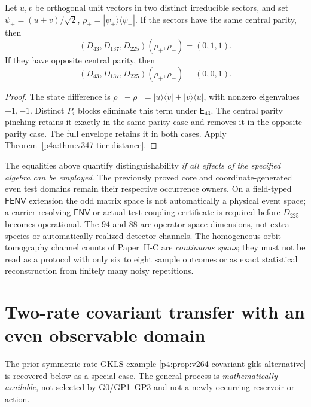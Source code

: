 \documentclass[12pt,a4paper]{article}
\begin{document}
\begin{corollary}
\label{p4a:cor:v347-tier-witness}
Let \(u,v\) be orthogonal unit vectors in two distinct irreducible
sectors, and set
\(\psi_\pm=(u\pm v)/\sqrt2\),
\(\rho_\pm=|\psi_\pm\rangle\langle\psi_\pm|\).
If the sectors have the same central parity, then
\[
 (D_{43},D_{137},D_{225})(\rho_+,\rho_-)=(0,1,1).
\]
If they have opposite central parity, then
\[
 (D_{43},D_{137},D_{225})(\rho_+,\rho_-)=(0,0,1).
\]
\end{corollary}
\begin{proof}
The state difference is
\(\rho_+-\rho_-=|u\rangle\langle v|+|v\rangle\langle u|\),
with nonzero eigenvalues \(+1,-1\).  Distinct \(P_i\) blocks eliminate
this term under \(\mathsf E_{43}\).  The central parity pinching retains
it exactly in the same-parity case and removes it in the opposite-parity
case.  The full envelope retains it in both cases.  Apply
Theorem~\ref{p4a:thm:v347-tier-distance}.
\end{proof}
\begin{remark}
\label{p4a:rem:v347-tier-license}
The equalities above quantify distinguishability \emph{if all effects of
the specified algebra can be employed}.  The previously proved core and
coordinate-generated even test domains remain their respective occurrence
owners.  On a field-typed \(\mathsf{FENV}\) extension the odd matrix space
is not automatically a physical event space; a carrier-resolving
\(\mathsf{ENV}\) or actual test-coupling certificate is required before
\(D_{225}\) becomes operational.  The \(94\) and \(88\) are operator-space
dimensions, not extra species or automatically realized detector channels.
The homogeneous-orbit tomography channel counts of Paper~II-C are
\emph{continuous spans}; they must not be read as a protocol with only six
to eight sample outcomes or as exact statistical reconstruction from
finitely many noisy repetitions.
\end{remark}



\clearpage
\section{Two-rate covariant transfer with an even observable domain}
\label{p4a:sec:v352-two-rate-transfer}
The prior symmetric-rate GKLS example
\ref{p4:prop:v264-covariant-gkls-alternative} is recovered below
as a special case.  The general process is \emph{mathematically
available}, not selected by G0/GP1--GP3 and not a newly occurring
reservoir or action.
\end{document}
